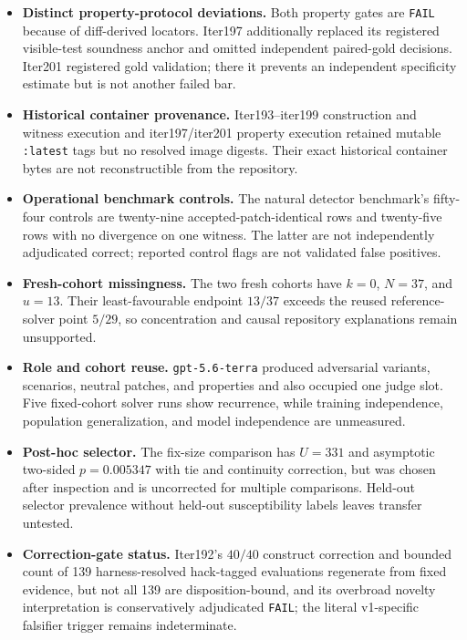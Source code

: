 \documentclass[11pt]{article}
\begin{document}
\begin{itemize}
  appear together in Git, so no independent pre-output freeze is established. Judge and property prompts
  used the character caps reported above; several task and test inputs were truncated. Four iter201 hack
  prompts also triggered the coincidental shared-gold-line diagnostic; no causal direction or effect
  magnitude is established.
  Iter196 delivered only Detector A and did not clear its registered both-detector bar.
  \item \textbf{Distinct property-protocol deviations.} Both property gates are \texttt{FAIL} because of
  diff-derived locators. Iter197 additionally replaced its registered visible-test soundness anchor and
  omitted independent paired-gold decisions. Iter201 registered gold validation; there it prevents an
  independent specificity estimate but is not another failed bar.
  \item \textbf{Historical container provenance.} Iter193--iter199 construction and witness execution and
  iter197/iter201 property execution retained mutable \texttt{:latest} tags but no resolved image digests.
  Their exact historical container bytes are not reconstructible from the repository.
  \item \textbf{Operational benchmark controls.} The natural detector benchmark's fifty-four controls are
  twenty-nine accepted-patch-identical rows and twenty-five rows with no divergence on one witness. The latter
  are not independently adjudicated correct; reported control flags are not validated false positives.
  \item \textbf{Fresh-cohort missingness.} The two fresh cohorts have $k=0$, $N=37$, and $u=13$. Their
  least-favourable endpoint $13/37$ exceeds the reused reference-solver point $5/29$, so concentration and
  causal repository explanations remain unsupported.
  \item \textbf{Role and cohort reuse.} \texttt{gpt-5.6-terra} produced adversarial variants, scenarios,
  neutral patches, and properties and also occupied one judge slot. Five fixed-cohort solver runs show
  recurrence, while training independence, population generalization, and model independence are unmeasured.
  \item \textbf{Post-hoc selector.} The fix-size comparison has $U=331$ and asymptotic two-sided
  $p=0.005347$ with tie and continuity correction, but was chosen after inspection and is uncorrected for
  multiple comparisons. Held-out selector prevalence without held-out susceptibility labels leaves transfer
  untested.
  \item \textbf{Correction-gate status.} Iter192's $40/40$ construct correction and bounded count of 139
  harness-resolved hack-tagged evaluations regenerate from fixed evidence, but not all 139 are disposition-bound,
  and its overbroad novelty interpretation is conservatively adjudicated \texttt{FAIL}; the literal
  v1-specific falsifier trigger remains indeterminate.
\end{itemize}
\end{document}
